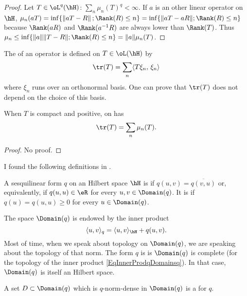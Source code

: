 \begin{proof}
Let $T\in\oL^q(\hH)$: $\sum_n\mu_n(T)^q<\infty$.  If $a$ is an other linear operator on $\hH$, $\mu_n(aT)=\inf\{ \| aT-R \|\,;\Rank(R)\leq n \}=\inf\{ \| aT-aR \|;\Rank(R)\leq n \}$ because $\Rank(aR)$ and $\Rank(a^{-1}R)$ are always lower than $\Rank(T)$. Thus $\mu_n\leq\inf\{ \| a \|\| T-R \|;\Rank(R)\leq n \}=\| a \|\mu_n(T)$.
\end{proof}

The  of an operator is defined on $T\in\oL(\hH)$ by
\begin{equation}
\tr(T)=\sum_{n}\langle T\xi_n,\,\xi_n\rangle
\end{equation}
where $\xi_n$ runs over an orthonormal basis. One can prove that $\tr(T)$ does not depend on the choice of this basis.

\begin{proposition}
When $T$ is compact and positive, on has
\[ 
  \tr(T)=\sum_{n}\mu_n(T).
\]

\end{proposition}
\begin{proof}
No proof.
\end{proof}

I found the following definitions in \cite{OlafPostDissertation}.
\begin{definition}
	A sesquilinear form $q$ on an Hilbert space $\hH$ is  if $q(u,v)=\overline{ q(v,u) }$ or, equivalently, if $q(u,u)\in\eR$ for every $u,v\in\Domain(q)$. It is  if $q(u)=q(u,u)\geq 0$ for every $u\in\Domain(q)$.
\end{definition}
The space $\Domain(q)$ is endowed by the inner product 
\begin{equation}		\label{EqInnerProdqDomainsq}
	\langle u, v\rangle_q=\langle u, v\rangle_{\hH}+q(u,v).
\end{equation}
Most of time, when we speak about topology on $\Domain(q)$, we are speaking about the topology of that norm. The form $q$ is  is $\Domain(q)$ is complete (for the topology of the inner product \eqref{EqInnerProdqDomainsq}). In that case, $\Domain(q)$ is itself an Hilbert space. 

\begin{definition}		\label{DefFormCoreDomq}
	A set $D\subset\Domain(q)$ which is $q$-norm-dense in $\Domain(q)$ is a  for $q$.
\end{definition}

